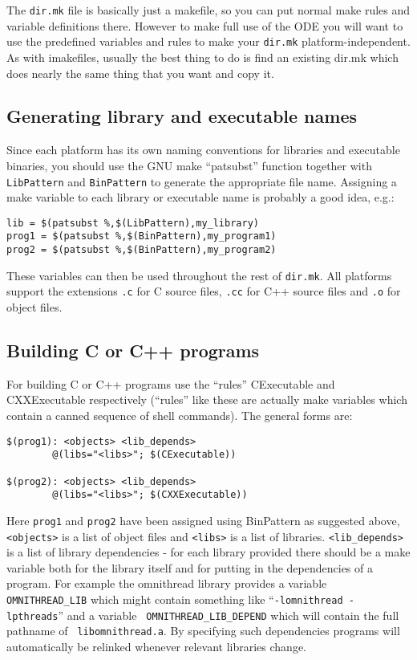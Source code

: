 \documentclass[11pt]{article}
\begin{document}
The {\tt dir.mk} file is basically just a makefile, so you can put normal make
rules and variable definitions there.  However to make full use of the ODE you
will want to use the predefined variables and rules to make your {\tt dir.mk}
platform-independent.  As with imakefiles, usually the best thing to do is find
an existing dir.mk which does nearly the same thing that you want and copy it.

\subsection{Generating library and executable names}

Since each platform has its own naming conventions for libraries and executable
binaries, you should use the GNU make ``patsubst'' function together with {\tt
LibPattern} and {\tt BinPattern} to generate the appropriate file name.
Assigning a make variable to each library or executable name is probably a good
idea, e.g.:

\begin{verbatim}
lib = $(patsubst %,$(LibPattern),my_library)
prog1 = $(patsubst %,$(BinPattern),my_program1)
prog2 = $(patsubst %,$(BinPattern),my_program2)
\end{verbatim}

These variables can then be used throughout the rest of {\tt dir.mk}.  All
platforms support the extensions {\tt .c} for C source files, {\tt .cc} for C++
source files and {\tt .o} for object files.

\subsection{Building C or C++ programs}

For building C or C++ programs use the ``rules'' CExecutable and CXXExecutable
respectively (``rules'' like these are actually make variables which contain a
canned sequence of shell commands).  The general forms are:

\begin{verbatim}
$(prog1): <objects> <lib_depends>
        @(libs="<libs>"; $(CExecutable))

$(prog2): <objects> <lib_depends>
        @(libs="<libs>"; $(CXXExecutable))
\end{verbatim}

Here {\tt prog1} and {\tt prog2} have been assigned using BinPattern as
suggested above, {\tt <objects>} is a list of object files and {\tt <libs>} is
a list of libraries.  {\tt <lib\_depends>} is a list of library dependencies -
for each library provided there should be a make variable both for the library
itself and for putting in the dependencies of a program.  For example the
omnithread library provides a variable {\tt OMNITHREAD\_LIB} which might
contain something like ``{\tt -lomnithread -lpthreads}'' and a variable {\tt
OMNITHREAD\_LIB\_DEPEND} which will contain the full pathname of {\tt
libomnithread.a}.  By specifying such dependencies programs will automatically
be relinked whenever relevant libraries change.
\end{document}
